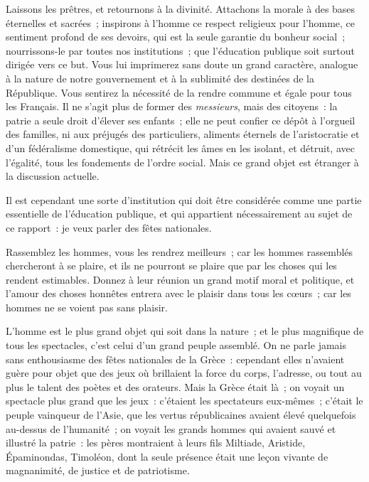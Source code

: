 \documentclass[french,twoside]{book} %
\begin{document}
Laissons les prêtres, et retournons à la divinité. Attachons la morale à des bases éternelles et sacrées ; inspirons à l’homme ce respect religieux pour l’homme, ce sentiment profond de ses devoirs, qui est la seule garantie du bonheur social ; nourrissons-le par toutes nos institutions ; que l’éducation publique soit surtout dirigée vers ce but. Vous lui imprimerez sans doute un grand caractère, analogue à la nature de notre gouvernement et à la sublimité des destinées de la République. Vous sentirez la nécessité de la rendre commune et égale pour tous les Français. Il ne s’agit plus de former des {\itshape messieurs}, mais des citoyens : la patrie a seule droit d’élever ses enfants ; elle ne peut confier ce dépôt à l’orgueil des familles, ni aux préjugés des particuliers, aliments éternels de l’aristocratie et d’un fédéralisme domestique, qui rétrécit les âmes en les isolant, et détruit, avec l’égalité, tous les fondements de l’ordre social. Mais ce grand objet est étranger à la discussion actuelle.\par
Il est cependant une sorte d’institution qui doit être considérée comme une partie essentielle de l’éducation publique, et qui appartient nécessairement au sujet de ce rapport : je veux parler des fêtes nationales.\par
Rassemblez les hommes, vous les rendrez meilleurs ; car les hommes rassemblés chercheront à se plaire, et ils ne pourront se plaire que par les choses qui les rendent estimables. Donnez à leur réunion un grand motif moral et politique, et l’amour des choses honnêtes entrera avec le plaisir dans tous les cœurs ; car les hommes ne se voient pas sans plaisir.\par
L’homme est le plus grand objet qui soit dans la nature ; et le plus magnifique de tous les spectacles, c’est celui d’un grand peuple assemblé. On ne parle jamais sans enthousiasme des fêtes nationales de la Grèce : cependant elles n’avaient guère pour objet que des jeux où brillaient la force du corps, l’adresse, ou tout au plus le talent des poètes et des orateurs. Mais la Grèce était là ; on voyait un spectacle plus grand que les jeux : c’étaient les spectateurs eux-mêmes ; c’était le peuple vainqueur de l’Asie, que les vertus républicaines avaient élevé quelquefois au-dessus de l’humanité ; on voyait les grands hommes qui avaient sauvé et illustré la patrie : les pères montraient à leurs fils Miltiade, Aristide, Épaminondas, Timoléon, dont la seule présence était une leçon vivante de magnanimité, de justice et de patriotisme.\par
\end{document}
